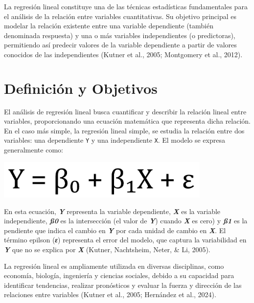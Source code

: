 \documentclass[
  spanish,
  a4paper,
  DIV=11,
  numbers=noendperiod,
  onepage,
  openany]{scrreprt}
\begin{document}
La regresión lineal constituye una de las técnicas estadísticas
fundamentales para el análisis de la relación entre variables
cuantitativas. Su objetivo principal es modelar la relación existente
entre una variable dependiente (también denominada respuesta) y una o
más variables independientes (o predictoras), permitiendo así predecir
valores de la variable dependiente a partir de valores conocidos de las
independientes (Kutner et al., 2005; Montgomery et al., 2012).

\section{Definición y Objetivos}\label{definiciuxf3n-y-objetivos}

El análisis de regresión lineal busca cuantificar y describir la
relación lineal entre variables, proporcionando una ecuación matemática
que representa dicha relación. En el caso más simple, la regresión
lineal simple, se estudia la relación entre dos variables: una
dependiente \texttt{Y} y una independiente \texttt{X}. El modelo se
expresa generalmente como:

\begin{center}
\includegraphics[width=4.16667in,height=\textheight,keepaspectratio]{images/clipboard-1828248141.png}
\end{center}

En esta ecuación, \textbf{\emph{Y}} representa la variable dependiente,
\textbf{\emph{X}} es la variable independiente, \textbf{\emph{ß0}} es la
intersección (el valor de \textbf{\emph{Y}}) cuando \textbf{\emph{X}} es
cero) y \textbf{\emph{ß1}} es la pendiente que indica el cambio en
\textbf{\emph{Y}} por cada unidad de cambio en \textbf{\emph{X}}. El
término epilson (\textbf{\emph{ε}}) representa el error del modelo, que
captura la variabilidad en \textbf{\emph{Y}} que no se explica por
\textbf{\emph{X}} (Kutner, Nachtsheim, Neter, \& Li, 2005).

La regresión lineal es ampliamente utilizada en diversas disciplinas,
como economía, biología, ingeniería y ciencias sociales, debido a su
capacidad para identificar tendencias, realizar pronósticos y evaluar la
fuerza y dirección de las relaciones entre variables (Kutner et al.,
2005; Hernández et al., 2024).
\end{document}
